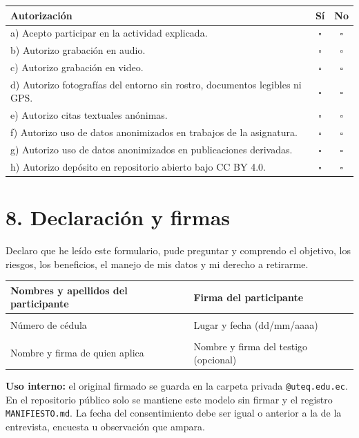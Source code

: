 \documentclass[11pt,a4paper]{article}
\begin{document}
\noindent\begin{tabularx}{\linewidth}{|X|c|c|}
\hline
\textbf{Autorizaci\'on} & \textbf{S\'i} & \textbf{No}\\
\hline
a) Acepto participar en la actividad explicada. & $\square$ & $\square$\\
\hline
b) Autorizo grabaci\'on en audio. & $\square$ & $\square$\\
\hline
c) Autorizo grabaci\'on en video. & $\square$ & $\square$\\
\hline
d) Autorizo fotograf\'ias del entorno sin rostro, documentos legibles ni GPS. & $\square$ & $\square$\\
\hline
e) Autorizo citas textuales an\'onimas. & $\square$ & $\square$\\
\hline
f) Autorizo uso de datos anonimizados en trabajos de la asignatura. & $\square$ & $\square$\\
\hline
g) Autorizo uso de datos anonimizados en publicaciones derivadas. & $\square$ & $\square$\\
\hline
h) Autorizo dep\'osito en repositorio abierto bajo CC BY 4.0. & $\square$ & $\square$\\
\hline
\end{tabularx}

\section*{8. Declaraci\'on y firmas}
Declaro que he le\'ido este formulario, pude preguntar y comprendo el objetivo, los riesgos, los beneficios, el manejo de mis datos y mi derecho a retirarme.

\vspace{0.6cm}
\noindent\begin{tabularx}{\linewidth}{|X|X|}
\hline
Nombres y apellidos del participante & Firma del participante\\
\hline
\vspace{0.8cm} & \\
\hline
N\'umero de c\'edula & Lugar y fecha (dd/mm/aaaa)\\
\hline
\vspace{0.8cm} & \\
\hline
Nombre y firma de quien aplica & Nombre y firma del testigo (opcional)\\
\hline
\end{tabularx}

\vspace{0.4cm}
\textbf{Uso interno:} el original firmado se guarda en la carpeta privada \texttt{@uteq.edu.ec}. En el repositorio p\'ublico solo se mantiene este modelo sin firmar y el registro \texttt{MANIFIESTO.md}. La fecha del consentimiento debe ser igual o anterior a la de la entrevista, encuesta u observaci\'on que ampara.
\end{document}
